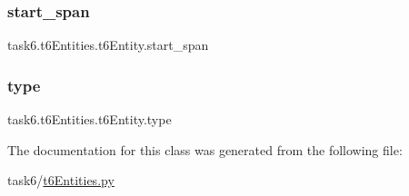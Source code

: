 \subsubsection{\texorpdfstring{start\+\_\+span}{start\_span}}
{\footnotesize\ttfamily task6.\+t6\+Entities.\+t6\+Entity.\+start\+\_\+span}

\mbox{\label{classtask6_1_1t6Entities_1_1t6Entity_af0496eb852234bb168ab22d031c99ed3}} 
\subsubsection{\texorpdfstring{type}{type}}
{\footnotesize\ttfamily task6.\+t6\+Entities.\+t6\+Entity.\+type}



The documentation for this class was generated from the following file\+:\begin{DoxyCompactItemize}
\item 
task6/\hyperlink{t6Entities_8py}{t6\+Entities.\+py}\end{DoxyCompactItemize}
